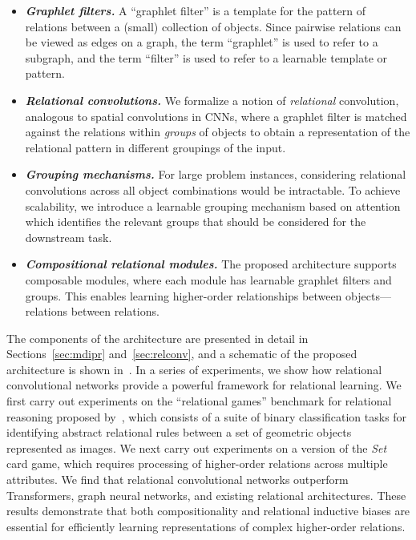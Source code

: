 \begin{itemize}%
    \item \textit{\bfseries Graphlet filters.} A ``graphlet filter'' is a template for the pattern of relations between a (small) collection of objects. 
    Since pairwise relations can be viewed as edges on a graph, the term ``graphlet'' is used to refer to a subgraph, and the term ``filter'' is used to refer to a learnable template or pattern.
    \item \textit{\bfseries Relational convolutions.} 
    We formalize a notion of \textit{relational} convolution, analogous to spatial convolutions in CNNs, where a graphlet filter is matched against the relations within \textit{groups} of objects to obtain a representation of the relational pattern in different groupings of the input.
    \item \textit{\bfseries Grouping mechanisms.} For large problem instances, considering relational convolutions across all object combinations would be intractable. To achieve scalability, we introduce a learnable grouping mechanism based on attention which identifies the relevant groups that should be considered for the downstream task.
    \item \textit{\bfseries Compositional relational modules.} The proposed architecture supports composable modules, where each module has learnable graphlet filters and groups. This enables learning higher-order relationships between objects---relations between relations.
\end{itemize}


The components of the architecture are presented in detail in Sections~\ref{sec:mdipr} and~\ref{sec:relconv}, and a schematic of the proposed architecture is shown in~. In a series of experiments, we show how relational convolutional networks provide a powerful framework
for relational learning. We first carry out experiments on the ``relational games'' benchmark for relational reasoning proposed by~\citet{shanahanExplicitlyRelationalNeural}, which consists of a suite of binary classification tasks for identifying abstract relational rules between a set of geometric objects represented as images. 
We next carry out experiments on a version of the \textit{Set} card game, which requires processing of higher-order relations across multiple attributes. We find that relational convolutional networks outperform Transformers, graph neural networks, and existing relational architectures. These results demonstrate that both compositionality and relational inductive biases are essential for efficiently learning representations of complex higher-order relations.

